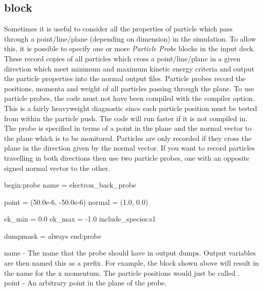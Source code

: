 \subsection{\texorpdfstring
  { block}
  {           {probe} block}}
\label{sec:probe_block}
Sometimes it is useful to consider all the properties of particle which pass
through a point/line/plane (depending on dimension) in the simulation. To
allow this, it is possible to specify one or more {\it Particle Probe} blocks
in the input deck. These record copies of all particles which cross a
point/line/plane in a given direction which meet minimum and maximum kinetic
energy criteria and output the particle properties into the normal output
files. Particle probes record the positions, momenta and weight of all
particles passing through the plane. To use particle probes, the code must
not have been
compiled with the  compiler option. This is
a fairly heavyweight diagnostic since each particle position must be tested
from within the particle push. The code will run faster if it is not compiled
in.\\

The probe is specified in terms of a point in the plane and the normal
vector to the plane which is to be monitored. Particles are only recorded
if they cross the plane in the direction given by the normal vector.
If you want to record particles travelling in both directions then use two
particle probes, one with an opposite signed normal vector to the other.
{\samepage
\begin{boxverbatim}
begin:probe
   name = electron_back_probe

   point = (50.0e-6, -50.0e-6)
   normal = (1.0, 0.0)

   ek_min = 0.0
   ek_max = -1.0
   include_species:s1

   dumpmask = always
end:probe
\end{boxverbatim}
}

{\emphtext name} - The name that the probe should have in output dumps. Output
  variables are then named this as a prefix. For example, the block shown above
  will result in the name  for
  the x momentum. The particle positions would just be called
  .\\

{\emphtext point} - An arbitrary point in the plane of the probe.\\

